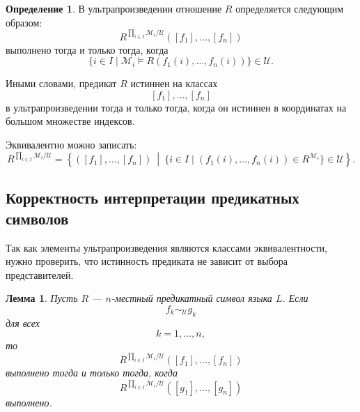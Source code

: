 \documentclass[12pt,a4paper,oneside,openany]{book}
\theoremstyle{definition}
\newtheorem{definition}{Определение}[chapter]
\theoremstyle{plain}
\newtheorem{lemma}{Лемма}[chapter]
\theoremstyle{remark}
\begin{document}
\begin{definition}
В ультрапроизведении отношение $R$ определяется следующим образом:
\[
R^{\prod_{i\in I}\mathcal M_i/\mathcal U}
([f_1],\ldots,[f_n])
\]
выполнено тогда и только тогда, когда
\[
\{i\in I\mid
\mathcal M_i\models R(f_1(i),\ldots,f_n(i))
\}\in\mathcal U.
\]
\end{definition}

Иными словами, предикат $R$ истиннен на классах
\[
[f_1],\ldots,[f_n]
\]
в ультрапроизведении тогда и только тогда, когда он истиннен в координатах на большом множестве индексов.

Эквивалентно можно записать:
\[
R^{\prod_{i\in I}\mathcal M_i/\mathcal U}
=
\left\{
([f_1],\ldots,[f_n])
\ \middle|\
\{i\in I\mid
(f_1(i),\ldots,f_n(i))\in R^{\mathcal M_i}
\}\in\mathcal U
\right\}.
\]

\subsection{Корректность интерпретации предикатных символов}

Так как элементы ультрапроизведения являются классами эквивалентности, нужно проверить, что истинность предиката не зависит от выбора представителей.

\begin{lemma}
Пусть $R$ — $n$-местный предикатный символ языка $L$. Если
\[
f_k\sim_{\mathcal U} g_k
\]
для всех
\[
k=1,\ldots,n,
\]
то
\[
R^{\prod_{i\in I}\mathcal M_i/\mathcal U}
([f_1],\ldots,[f_n])
\]
выполнено тогда и только тогда, когда
\[
R^{\prod_{i\in I}\mathcal M_i/\mathcal U}
([g_1],\ldots,[g_n])
\]
выполнено.
\end{lemma}
\end{document}
